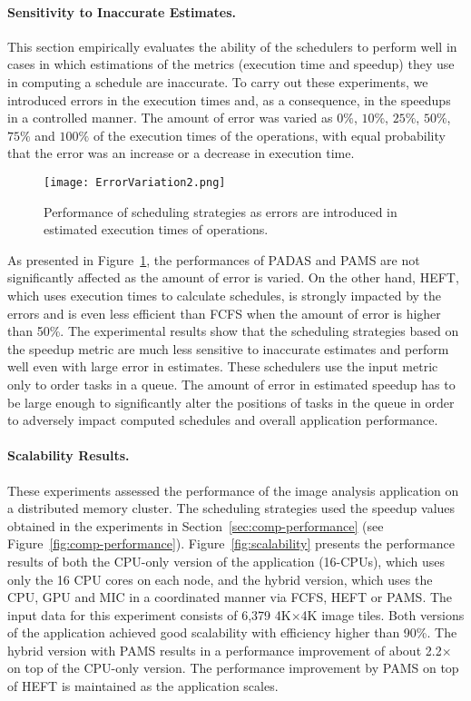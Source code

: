 \paragraph{{\bf Sensitivity to Inaccurate Estimates.}} \label{sec:sensibility}
This section empirically evaluates the ability of the schedulers to perform well
in cases in which estimations of the metrics (execution time and speedup) they 
use in computing a schedule are inaccurate. To carry out these experiments, we
introduced errors in the execution times and, as a consequence, in the
speedups in a controlled manner. The amount of error was varied as 
$0\%$, $10\%$, $25\%$, $50\%$, $75\%$ and $100\%$ of the execution
times of the operations, with equal probability that the error was an increase 
or a decrease in execution time. 
\begin{figure}[htb!]
	\centering
	\texttt{[image: ErrorVariation2.png]}
	\vspace{-2mm}
	\caption{Performance of scheduling strategies as errors are 
	introduced in estimated execution times of operations.}
	\label{fig:errorVariation}
	\vspace{-2mm}
\end{figure}

As presented in Figure~\ref{fig:errorVariation}, the performances of PADAS and
PAMS are not significantly affected as the amount of error is varied. On the other
hand, HEFT, which uses execution times to calculate schedules, is strongly
impacted by the errors and is even less efficient than FCFS when the amount of 
error is higher 
than 50\%. The experimental results show that the scheduling
strategies based on the speedup metric are much less sensitive to inaccurate 
estimates and perform well even with large error in estimates. 
These schedulers use the input metric only to order tasks in a queue. The amount 
of error in estimated speedup has to be large enough to significantly alter the 
positions of tasks in the queue in order to adversely impact computed schedules 
and overall application performance. 
\paragraph{{\bf Scalability Results.}}
These experiments assessed the performance of the image analysis 
application on a distributed memory cluster. 
The scheduling strategies used the speedup values 
obtained in the experiments in Section~\ref{sec:comp-performance} (see 
Figure~\ref{fig:comp-performance}). 
Figure~\ref{fig:scalability} presents the performance results of both the
CPU-only version of the application (16-CPUs), which uses only the 16 CPU 
cores on each node, and the hybrid version, which uses the CPU, GPU and MIC 
in a coordinated manner via FCFS, HEFT or PAMS. The input data for this 
experiment consists of 6,379 4K$\times$4K image tiles. Both versions of the 
application achieved good scalability with efficiency higher than 90\%. 
The hybrid version with PAMS results in a performance improvement of 
about 2.2$\times$ on top of the CPU-only version. The performance 
improvement by PAMS on top of HEFT is maintained as the 
application scales.

